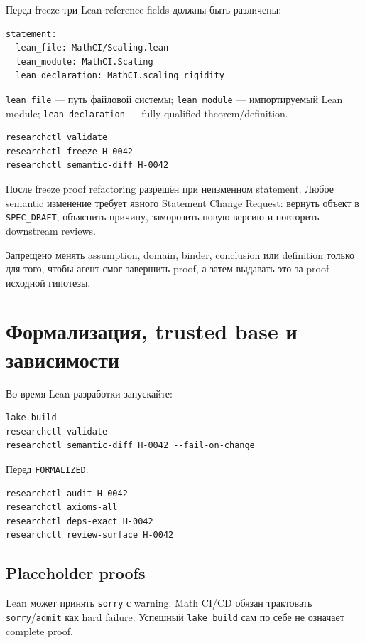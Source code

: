 \documentclass[11pt,a4paper]{article}
\newcommand{\status}[1]{\texttt{#1}}
\newcommand{\cmd}[1]{\texttt{#1}}
\begin{document}
Перед freeze три Lean reference fields должны быть различены:

\begin{lstlisting}[style=yaml]
statement:
  lean_file: MathCI/Scaling.lean
  lean_module: MathCI.Scaling
  lean_declaration: MathCI.scaling_rigidity
\end{lstlisting}

\texttt{lean\_file} --- путь файловой системы; \texttt{lean\_module} --- импортируемый Lean module; \texttt{lean\_declaration} --- fully-qualified theorem/definition.

\begin{lstlisting}
researchctl validate
researchctl freeze H-0042
researchctl semantic-diff H-0042
\end{lstlisting}

После freeze proof refactoring разрешён при неизменном statement. Любое semantic изменение требует явного Statement Change Request: вернуть объект в \status{SPEC\_DRAFT}, объяснить причину, заморозить новую версию и повторить downstream reviews.

\begin{dangerbox}
Запрещено менять assumption, domain, binder, conclusion или definition только для того, чтобы агент смог завершить proof, а затем выдавать это за proof исходной гипотезы.
\end{dangerbox}

\section{Формализация, trusted base и зависимости}

Во время Lean-разработки запускайте:

\begin{lstlisting}
lake build
researchctl validate
researchctl semantic-diff H-0042 --fail-on-change
\end{lstlisting}

Перед \status{FORMALIZED}:

\begin{lstlisting}
researchctl audit H-0042
researchctl axioms-all
researchctl deps-exact H-0042
researchctl review-surface H-0042
\end{lstlisting}

\subsection{Placeholder proofs}

Lean может принять \texttt{sorry} с warning. Math CI/CD обязан трактовать \texttt{sorry}/\texttt{admit} как hard failure. Успешный \cmd{lake build} сам по себе не означает complete proof.
\end{document}
